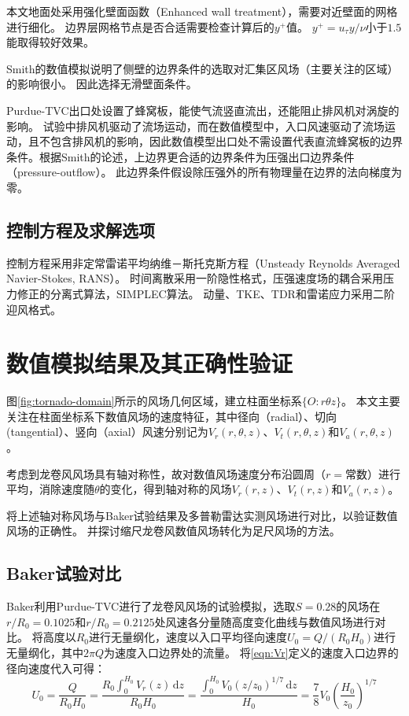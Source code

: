 本文地面处采用强化壁面函数（Enhanced wall treatment\cite{fluent2015user}），需要对近壁面的网格进行细化。
边界层网格节点是否合适需要检查计算后的$y^{+}$值。
$y^{+}=u_{\tau} y/\nu$小于$1.5$能取得较好效果。

Smith的数值模拟\cite{smith1987effect}说明了侧壁的边界条件的选取对汇集区风场（主要关注的区域）的影响很小。
因此选择无滑壁面条件。

Purdue-TVC出口处设置了蜂窝板，能使气流竖直流出，还能阻止排风机对涡旋的影响。
试验中排风机驱动了流场运动，而在数值模型中，入口风速驱动了流场运动，且不包含排风机的影响，因此数值模型出口处不需设置代表直流蜂窝板的边界条件。根据Smith\cite{smith1987effect}的论述，上边界更合适的边界条件为压强出口边界条件（pressure-outflow）。
此边界条件假设除压强外的所有物理量在边界的法向梯度为零\cite{fluent2015user}。



\subsection{控制方程及求解选项}
控制方程采用非定常雷诺平均纳维－斯托克斯方程（Unsteady Reynolds Averaged Navier-Stokes, RANS）。
时间离散采用一阶隐性格式，压强速度场的耦合采用压力修正的分离式算法，SIMPLEC算法。
动量、TKE、TDR和雷诺应力采用二阶迎风格式。



\section{数值模拟结果及其正确性验证}\label{sec:tornado}
图\ref{fig:tornado-domain}所示的风场几何区域，建立柱面坐标系$\{O:r \theta z\}$。
本文主要关注在柱面坐标系下数值风场的速度特征，其中径向（radial）、切向(tangential）、竖向（axial）风速分别记为$V_r(r,\theta,z)$、$V_t(r,\theta,z)$和$V_a(r,\theta,z)$。

考虑到龙卷风风场具有轴对称性，故对数值风场速度分布沿圆周（$r=$常数）进行平均，消除速度随$\theta$的变化，得到轴对称的风场$V_r(r,z)$、$V_t(r,z)$和$V_a(r,z)$。

将上述轴对称风场与Baker试验\cite{baker1981boundary}结果及多普勒雷达实测风场进行对比，以验证数值风场的正确性。
并探讨缩尺龙卷风数值风场转化为足尺风场的方法。



\subsection{Baker试验对比}
Baker利用Purdue-TVC进行了龙卷风风场的试验模拟\cite{baker1981boundary}，选取$S=0.28$的风场在$r/R_0=0.1025$和$r/R_0=0.2125$处风速各分量随高度变化曲线与数值风场进行对比。
将高度以$R_0$进行无量纲化，速度以入口平均径向速度$U_0=Q/(R_0 H_0)$进行无量纲化，其中$2\pi Q$为速度入口边界处的流量。
将\eqref{eqn:Vr}定义的速度入口边界的径向速度代入可得：
\begin{equation}
  U_0 = \frac{Q}{R_0 H_0} = \frac{R_0 \int_0^{H_0} V_r(z)\,\mathrm{d}z}{R_0 H_0} = \frac{\int_0^{H_0} V_0 (z/z_0)^{1/7}\,\mathrm{d}z}{H_0} = \frac{7}{8} V_0 \left(\frac{H_0}{z_0}\right)^{1/7}
\end{equation}


